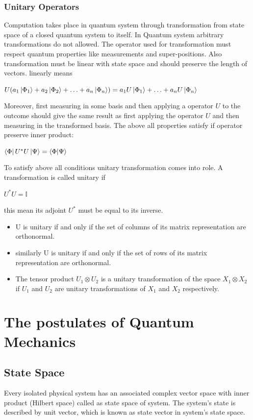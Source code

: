 \documentclass[11 pt]{article}
\theoremstyle{definition}
\theoremstyle{remark}
\newcommand{\tens}[1]{
  \mathbin{\mathop{\otimes}\limits_{#1}}}
\begin{document}
\subsubsection{Unitary Operators}
Computation takes place in quantum system through transformation from state space of a closed quantum system to itself. In Quantum system arbitrary transformations do not allowed. The operator used for transformation must respect quantum properties like measurements and super-positions. Also transformation must be linear with state space and should preserve the length of vectors. linearly means
\begin{center}
    $U(a_1\ket{\Phi_1} + a_2\ket{\Phi_2} + \hdots + a_n\ket{\Phi_n}) = a_{1}U\ket{\Phi_1} + \hdots + a_{n}U\ket{\Phi_n}$
\end{center}
 Moreover, first measuring in some basis and then applying a operator $U$ to the outcome should give the same result as first applying the operator $U$ and then measuring in the transformed basis. The above all properties satisfy if operator preserve inner product:
 \begin{center}
     $\bra{\Phi}U^{*}U\ket{\Psi} = \bra{\Phi}\ket{\Psi}$
 \end{center}
 To satisfy above all conditions unitary transformation comes into role. A transformation is called unitary if
\begin{center}
$U^{*}U=\mathbb{I}$
\end{center}
this mean its adjoint $U^{*}$ must be equal to its inverse.
\begin{itemize}
\item U is unitary if and only if the set of columns of its matrix representation are orthonormal.
\item similarly U is unitary if and only if the set of rows of its matrix representation are orthonormal.
\item  The tensor product $U_1 \tens{} U_2$ is a unitary transformation of the space $X_1 \tens{} X_2$ if $U_1$ and $U_2$ are unitary transformations of $X_1$ and $X_2$ respectively.
\end{itemize}



\section{The postulates of Quantum Mechanics}

\subsection{State Space}
Every isolated physical system has an associated complex vector space with inner product (Hilbert space) called as state space of system. The system's state is described by unit vector, which is known as state vector in system's state space.  
\end{document}
